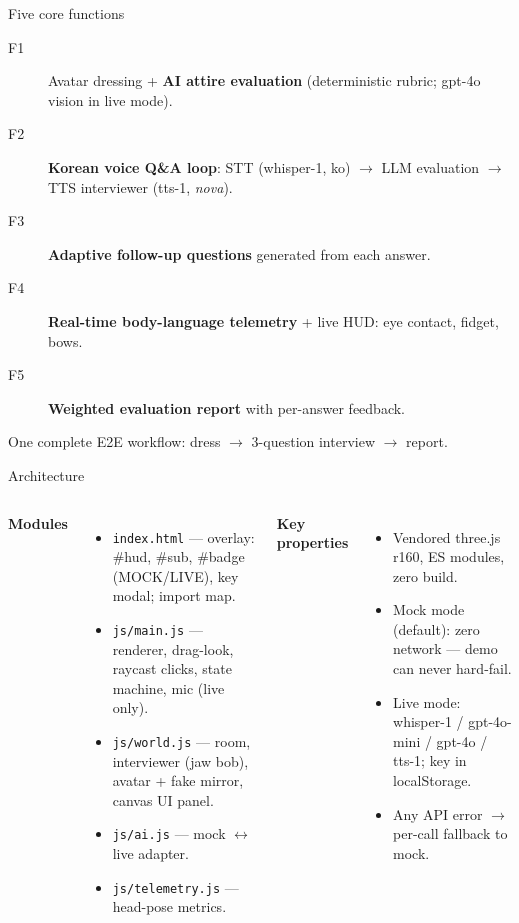 \documentclass{beamer}
\begin{document}
\begin{frame}{Five core functions}
  \begin{description}
    \item[F1] Avatar dressing + \textbf{AI attire evaluation} (deterministic rubric; gpt-4o vision in live mode).
    \item[F2] \textbf{Korean voice Q\&A loop}: STT (whisper-1, ko) \(\to\) LLM evaluation \(\to\) TTS interviewer (tts-1, \emph{nova}).
    \item[F3] \textbf{Adaptive follow-up questions} generated from each answer.
    \item[F4] \textbf{Real-time body-language telemetry} + live HUD: eye contact, fidget, bows.
    \item[F5] \textbf{Weighted evaluation report} with per-answer feedback.
  \end{description}
  \bigskip
  One complete E2E workflow: dress \(\to\) 3-question interview \(\to\) report.
\end{frame}

\begin{frame}{Architecture}
  \begin{columns}[t]
      \textbf{Modules}
      \begin{itemize}\small
        \item \texttt{index.html} --- overlay: \#hud, \#sub, \#badge (MOCK/LIVE), key modal; import map.
        \item \texttt{js/main.js} --- renderer, drag-look, raycast clicks, state machine, mic (live only).
        \item \texttt{js/world.js} --- room, interviewer (jaw bob), avatar + fake mirror, canvas UI panel.
        \item \texttt{js/ai.js} --- mock \(\leftrightarrow\) live adapter.
        \item \texttt{js/telemetry.js} --- head-pose metrics.
      \end{itemize}
      \textbf{Key properties}
      \begin{itemize}\small
        \item Vendored three.js r160, ES modules, zero build.
        \item Mock mode (default): zero network --- demo can never hard-fail.
        \item Live mode: whisper-1 / gpt-4o-mini / gpt-4o / tts-1; key in localStorage.
        \item Any API error \(\to\) per-call fallback to mock.
      \end{itemize}
  \end{columns}
\end{frame}
\end{document}
